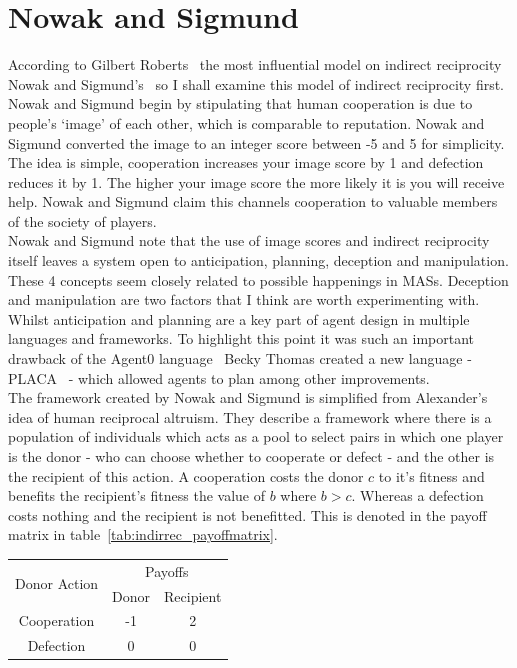 \documentclass[]{final_report}
\begin{document}
\section{Nowak and Sigmund}
\label{sec:nowak_sig}
According to Gilbert Roberts~\cite{evoldirindir} the most influential model on indirect reciprocity Nowak and Sigmund's~\cite{evol_indirect_image} so I shall examine this model of indirect reciprocity first. Nowak and Sigmund begin by stipulating that human cooperation is due to people's `image' of each other, which is comparable to reputation. Nowak and Sigmund converted the image to an integer score between -5 and 5 for simplicity.\\
The idea is simple, cooperation increases your image score by 1 and defection reduces it by 1. The higher your image score the more likely it is you will receive help. Nowak and Sigmund claim this channels cooperation to valuable members of the society of players.\\
Nowak and Sigmund note that the use of image scores and indirect reciprocity itself leaves a system open to anticipation, planning, deception and manipulation. These 4 concepts seem closely related to possible happenings in MASs. Deception and manipulation are two factors that I think are worth experimenting with. Whilst anticipation and planning are a key part of agent design in multiple languages and frameworks. To highlight this point it was such an important drawback of the Agent0 language~\cite{shoham1991agent0} Becky Thomas created a new language - PLACA~\cite{thomas1993placa} - which allowed agents to plan among other improvements.\\
The framework created by Nowak and Sigmund is simplified from Alexander's~\cite{alexander1987biology} idea of human reciprocal altruism. They describe a framework where there is a population of individuals which acts as a pool to select pairs in which one player is the donor - who can choose whether to cooperate or defect - and the other is the recipient of this action. A cooperation costs the donor $c$ to it's fitness and benefits the recipient's fitness the value of $b$ where $b>c$. Whereas a defection costs nothing and the recipient is not benefitted. This is denoted in the payoff matrix in table~\ref{tab:indirrec_payoffmatrix}.\\
\begin{framed}
	\begin{center}
		\begin{tabular}{c|c|c}
		\multirow{2}{*}{Donor Action} & \multicolumn{2}{c}{Payoffs}\\		
		& Donor & Recipient\\
		\hline
		Cooperation & -1 & 2\\
		\hline
		Defection & 0 & 0\\
		\end{tabular}
		\label{tab:indirrec_payoffmatrix}
	\end{center}	
\end{framed}
\end{document}
